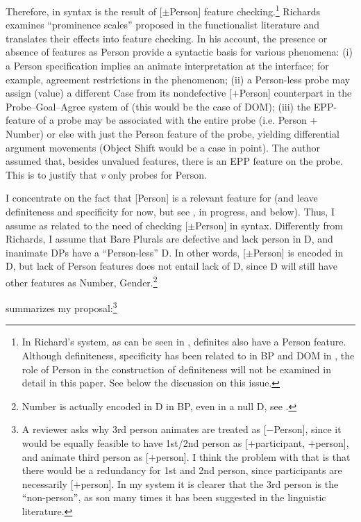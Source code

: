 \documentclass[output=paper]{langsci/langscibook}
\begin{document}
Therefore,  in syntax is the result of [$\pm$Person] feature
checking.\footnote{In Richard's system, as can be seen in ,
definites also have a Person feature. Although definiteness, specificity has
been related to  in \gls{BP} and DOM in , the role of Person in
the construction of definiteness will not be examined in detail in this paper.
See below the discussion on this issue.} Richards examines \enquote{prominence
scales} proposed in the functionalist literature and translates their effects
into feature checking. In his account, the presence or absence of features as
Person provide a syntactic basis for various phenomena: (i) a Person
specification implies an animate interpretation at the interface; for example,
agreement restrictions in the  phenomenon; (ii) a
Person-less probe may assign (value) a different Case from its nondefective
[$+$Person] counterpart in the Probe--Goal--Agree system of \citealt{Chomsky2001}
(this would be the case of DOM); (iii) the \gls{EPP}-feature of a probe may be
associated with the entire probe (i.e. Person + Number) or else with just the
Person feature of the probe, yielding differential argument movements (Object
Shift would be a case in point).  The author assumed that, besides unvalued
features, there is an \gls{EPP} feature on the probe. This is to justify that
\emph{v} only probes for Person.

I concentrate on the fact that [Person] is a relevant feature for  (and
leave definiteness and specificity for now, but see \citealt{IrimiaCyrino2015},
in progress, and below). Thus, I assume  as related to the need of
checking [$\pm$Person] in syntax. Differently from Richards, I assume that Bare
Plurals are defective and lack person in D,  and inanimate DPs have a
\enquote{Person-less} D. In other words, [$\pm$Person] is encoded in D, but lack of
Person features does not entail lack of D, since D will still have other
features as Number, Gender.\footnote{Number is actually encoded in D in
\gls{BP}, even in a null D, see
\citet{CyrinoEspinal2015}.}

 summarizes my proposal:\footnote{A reviewer asks why 3rd
    person animates are treated as [$-$Person], since it would be equally
    feasible to have 1st/2nd person as [$+$participant,
    +person], and animate third person as [$+$person].  I
    think the problem with that is that there would be a redundancy for 1st and
    2nd person, since participants are necessarily
    [$+$person]. In my system it is clearer that the 3rd person is the \enquote{non-person}, as son many times it has been suggested
in the linguistic literature.}
\end{document}

